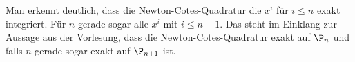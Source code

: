 \documentclass{mywork}
\begin{document}
\begin{aufgabe}
\begin{enumerate}[a)]
			Man erkennt deutlich, dass die Newton-Cotes-Quadratur die $x^i$ für $i \le n$ exakt integriert.						
			Für $n$ gerade sogar alle $x^i$ mit $i \le n+1$.
			Das steht im Einklang zur Aussage aus der Vorlesung, dass die Newton-Cotes-Quadratur exakt auf $\P_n$ und falls $n$ gerade sogar exakt auf $\P_{n+1}$ ist.
	\end{enumerate}
	
\end{aufgabe}
\end{document}
